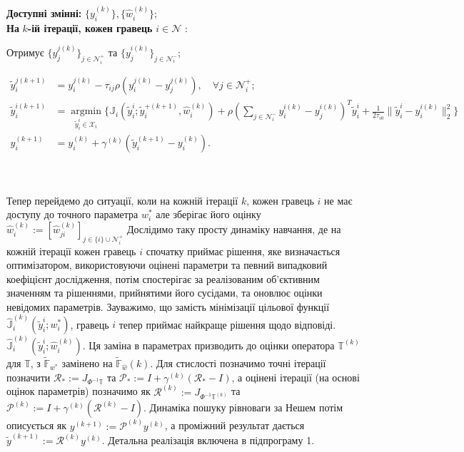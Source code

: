 \documentclass[a4paper]{article}
\begin{document}
\textbf{Доступні змінні:} $\{y_{i}^{(k)}\},\{\hat{w}_{i}^{(k)}\}$;\\
\textbf{На} $k$\textbf{-ій ітерації, кожен гравець} $i \in \mathcal{N}$ :

Отримує $\{y_{j}^{j(k)}\}_{j \in \mathcal{N}_{i}^{+}}$ та $\{y_{j}^{i(k)}\}_{j \in \mathcal{N}_{i}^{-}}$;

$
\begin{aligned}
\tilde{y}_{i}^{j(k+1)} &=y_{i}^{j(k)}-\tau_{i j} \rho(y_{i}^{j(k)}-y_{j}^{j(k)}), \quad \forall j \in \mathcal{N}_{i}^{+} ; \\
\tilde{y}_{i}^{i(k+1)} &=\underset{\tilde{y}_{i}^{i} \in \mathcal{X}_{i}}{\operatorname{argmin}}\{\mathbb{J}_{i}(\tilde{y}_{i}^{i} ; \tilde{y}_{i}^{+(k+1)}, \hat{w}_{i}^{(k)})+\rho(\sum_{j \in \mathcal{N}_{i}^{-}} y_{i}^{i(k)}-y_{j}^{i(k)})^{T} \tilde{y}_{i}^{i}+\frac{1}{2 \tau_{i 0}}\|\tilde{y}_{i}^{i}-y_{i}^{i(k)}\|_{2}^{2}\} \\
y_{i}^{(k+1)} &=y_{i}^{(k)}+\gamma^{(k)}(\tilde{y}_{i}^{(k+1)}-y_{i}^{(k)}) .
\end{aligned}
$\\

\hline\\\

Тепер перейдемо до ситуації, коли на кожній ітерації $k$, кожен гравець $i$ не має доступу до точного параметра $w_{i}^{*}$ але зберігає його оцінку $\hat{w}_{i}^{(k)}:=[\hat{w}_{j i}^{(k)}]_{j \in\{i\} \cup \mathcal{N}_{i}^{+}}$ Дослідимо таку просту динаміку навчання, де на кожній ітерації кожен гравець $i$ спочатку приймає рішення, яке визначається оптимізатором, використовуючи оцінені параметри та певний випадковий коефіцієнт дослідження, потім спостерігає за реалізованим об'єктивним значенням та рішеннями, прийнятими його сусідами, та оновлює оцінки невідомих параметрів. Зауважимо, що замість мінімізації цільової функції $\hat{\mathbb{J}}_{i}^{(k)}(\tilde{y}_{i}^{i} ; w_{i}^{*})$, гравець $i$ тепер приймає найкраще рішення щодо відповіді. $\hat{\mathbb{J}}_{i}^{(k)}(\tilde{y}_{i}^{i} ; \hat{w}_{i}^{(k)})$. Ця заміна в параметрах призводить до оцінки оператора $\mathbb{T}^{(k)}$ для $\mathbb{T}$, з $\tilde{\mathbb{F}}_{w^{*}}$ замінено на $\tilde{\mathbb{F}}_{\hat{w}}(k).$ Для стислості позначимо точні ітерації позначити $\mathscr{R}_{*}:=J_{\Phi^{-1} \mathbb{T}}$ та $\mathscr{P}_{*}:=I+\gamma^{(k)}\left(\mathscr{R}_{*}-I\right)$, а оцінені ітерації (на основі оцінок параметрів) позначимо як $\mathscr{R}^{(k)}:=J_{\Phi^{-1} \mathbb{T}^{(k)}}$ та $\mathscr{P}^{(k)}:=I+\gamma^{(k)}\left(\mathscr{R}^{(k)}-I\right)$. Динаміка пошуку рівноваги за Нешем потім описується як $y^{(k+1)}:=\mathscr{P}^{(k)} y^{(k)}$, а проміжний результат дається $\tilde{y}^{(k+1)}:=\mathscr{R}^{(k)} y^{(k)}$. Детальна реалізація включена в підпрограму 1.
\end{document}
